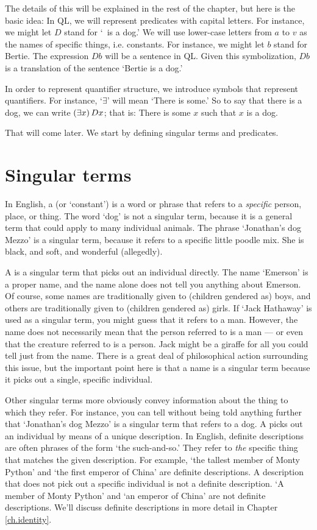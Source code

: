 The details of this will be explained in the rest of the chapter, but here is the basic idea: In QL, we will represent predicates with capital letters. For instance, we might let $D$ stand for `\blank\ is a dog.' We will use lower-case letters from $a$ to $v$ as the names of specific things, i.e. constants. For instance, we might let $b$ stand for Bertie. The expression $Db$ will be a sentence in QL. Given this symbolization, $Db$ is a translation of the sentence `Bertie is a dog.'

In order to represent quantifier structure, we introduce symbols that represent quantifiers. For instance, `$\exists$' will mean `There is some\blank.' So to say that there is a dog, we can write $(\exists x) \, Dx$; that is: There is some $x$ such that $x$ is a dog.

That will come later. We start by defining singular terms and predicates.


\section{Singular terms}
In English, a  (or `constant') is a word or phrase that refers to a \emph{specific} person, place, or thing. The word `dog' is not a singular term, because it is a general term that could apply to many individual animals. The phrase `Jonathan's dog Mezzo' is a singular term, because it refers to a specific little poodle mix. She is black, and soft, and wonderful (allegedly).

A  is a singular term that picks out an individual directly. The name `Emerson' is a proper name, and the name alone does not tell you anything about Emerson. Of course, some names are traditionally given to {\color{black}(children gendered as)} boys, and others are traditionally given to {\color{black}(children gendered as)} girls. If `Jack Hathaway' is used as a singular term, you might guess that it refers to a man. However, the name does not necessarily mean that the person referred to is a man --- or even that the creature referred to is a person. Jack might be a giraffe for all you could tell just from the name. There is a great deal of philosophical action surrounding this issue, but the important point here is that a name is a singular term because it picks out a single, specific individual.

Other singular terms more obviously convey information about the thing to which they refer. For instance, you can tell without being told anything further that `Jonathan's dog Mezzo' is a singular term that refers to a dog. A  picks out an individual by means of a unique description. In English, definite descriptions are often phrases of the form `the such-and-so.' They refer to \emph{the} specific thing that matches the given description. For example, `the tallest member of Monty Python' and `the first emperor of China' are definite descriptions. A description that does not pick out a specific individual is not a definite description. `A member of Monty Python' and `an emperor of China' are not definite descriptions. We'll discuss definite descriptions in more detail in Chapter \ref{ch.identity}.

